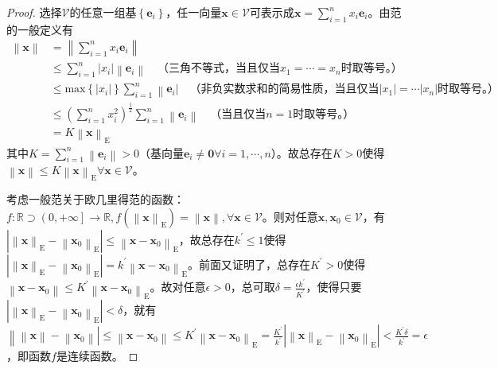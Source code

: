 \documentclass[main.tex]{subfiles}
\begin{document}
\begin{proof}
选择$\mathcal{V}$的任意一组基$\left\{\mathbf{e}_i\right\}$，任一向量$\mathbf{x}\in\mathcal{V}$可表示成$\mathbf{x}=\sum_{i=1}^nx_i\mathbf{e}_i$。由范的一般定义有
\begin{align*}
    \left\|\mathbf{x}\right\|&=\left\|\sum_{i=1}^nx_i\mathbf{e}_i\right\|\\
    &\leq\sum_{i=1}^n\left|x_i\right|\left\|\mathbf{e}_i\right\|\quad\text{（三角不等式，当且仅当}x_1=\cdots=x_n\text{时取等号。）}\\
    &\leq\mathrm{max}\left\{\left|x_i\right|\right\}\sum_{i=1}^n\left\|\mathbf{e}_i\right|\quad\text{（非负实数求和的简易性质，当且仅当}\left|x_1\right|=\cdots\left|x_n\right|\text{时取等号。）}\\
    &\leq\left(\sum_{i=1}^nx_i^2\right)^\frac{1}{2}\sum_{i=1}^n\left\|\mathbf{e}_i\right\|\quad\text{（当且仅当}n=1\text{时取等号。）}\\
    &=K\left\|\mathbf{x}\right\|_\mathrm{E}
\end{align*}
其中$K=\sum_{i=1}^n\left\|\mathbf{e}_i\right\|>0$（基向量$\mathbf{e}_i\neq\mathbf{0}\forall i=1,\cdots,n$）。故总存在$K>0$使得$\left\|\mathbf{x}\right\|\leq K\left\|\mathbf{x}\right\|_\mathrm{E}\forall\mathbf{x}\in\mathcal{V}$。

考虑一般范关于欧几里得范的函数：$f:\mathbb{R}\supset\left(0,+\infty\right]\rightarrow\mathbb{R},f\left(\left\|\mathbf{x}\right\|_\mathrm{E}\right)=\left\|\mathbf{x}\right\|,\forall\mathbf{x}\in\mathcal{V}$。则对任意$\mathbf{x},\mathbf{x}_0\in\mathcal{V}$，有$\left|\left\|\mathbf{x}\right\|_\mathrm{E}-\left\|\mathbf{x}_0\right\|_\mathrm{E}\right|\leq\left\|\mathbf{x}-\mathbf{x}_0\right\|_\mathrm{E}$，故总存在$k^\prime\leq1$使得$\left|\left\|\mathbf{x}\right\|_\mathrm{E}-\left\|\mathbf{x}_0\right\|_\mathrm{E}\right|=k^\prime\left\|\mathbf{x}-\mathbf{x}_0\right\|_\mathrm{E}$。前面又证明了，总存在$K^\prime>0$使得$\left\|\mathbf{x}-\mathbf{x}_0\right\|\leq K^\prime\left\|\mathbf{x}-\mathbf{x}_0\right\|_\mathrm{E}$。故对任意$\epsilon>0$，总可取$\delta=\frac{\epsilon k^\prime}{K^\prime}$，使得只要$\left|\left\|\mathbf{x}\right\|_\mathrm{E}-\left\|\mathbf{x}_0\right\|_\mathrm{E}\right|<\delta$，就有$\left\|\left\|\mathbf{x}\right\|-\left\|\mathbf{x}_0\right\|\right|\leq\left\|\mathbf{x}-\mathbf{x}_0\right\|\leq K^\prime\left\|\mathbf{x}-\mathbf{x}_0\right\|_\mathrm{E}=\frac{K^\prime}{k^\prime}\left|\left\|\mathbf{x}\right\|_\mathrm{E}-\left\|\mathbf{x}_0\right\|_\mathrm{E}\right|<\frac{K^\prime\delta}{k^\prime}=\epsilon$，即函数$f$是连续函数。


\end{proof}
\end{document}
